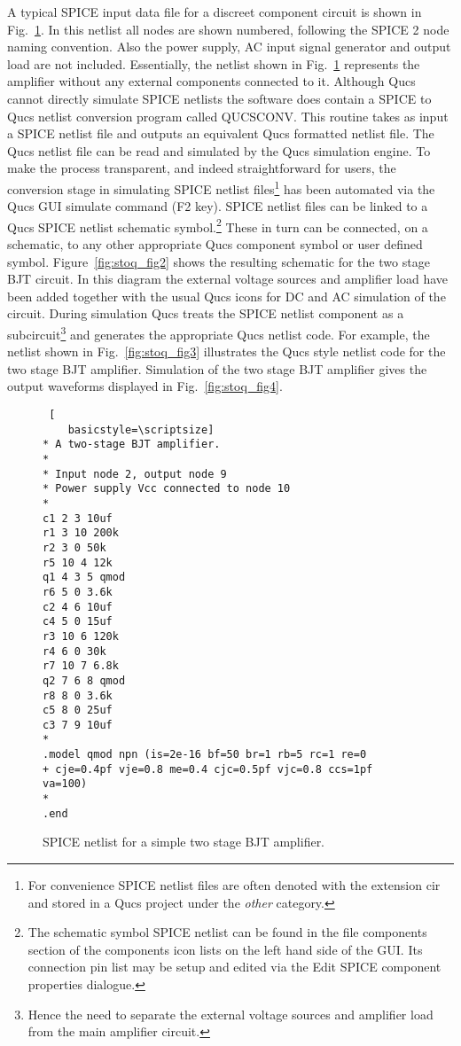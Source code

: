 A typical SPICE input data file for a discreet component circuit is shown in Fig.~\ref{fig:stoq_fig1}.  In this netlist all nodes are shown numbered, following the SPICE 2 node naming convention. Also the power supply, AC input signal generator and output load are not included. Essentially, the netlist shown in Fig.~\ref{fig:stoq_fig1} represents the amplifier without any external components connected to it. Although Qucs cannot directly simulate SPICE netlists the software does contain a SPICE to Qucs netlist conversion program called QUCSCONV. This routine takes as input a SPICE netlist file and outputs an equivalent Qucs formatted netlist file.  The Qucs netlist file can be read and simulated by the Qucs simulation engine.  To make the process transparent, and indeed straightforward for users, the conversion stage in simulating SPICE netlist files\footnote{For convenience SPICE netlist files are often denoted with the extension cir and stored in a Qucs project under the \textit{other} category.} has been automated via the Qucs GUI simulate command (F2 key). SPICE netlist files can be linked to a Qucs SPICE netlist schematic symbol.\footnote{The schematic symbol SPICE netlist can be found in the file components section of the components icon lists on the left hand side of the GUI. Its connection pin list may be setup and edited via the Edit SPICE component properties dialogue.} These in turn can be connected, on a schematic, to any other appropriate Qucs component symbol or user defined symbol. Figure~\ref{fig:stoq_fig2} shows the resulting schematic for the two stage BJT circuit.  In this diagram the external voltage sources and amplifier load have been added together with the usual Qucs icons for DC and AC simulation of the circuit. During simulation Qucs treats the SPICE netlist component as a subcircuit\footnote{Hence the need to separate the external voltage sources and amplifier load from the main amplifier circuit.} and generates the appropriate Qucs netlist code. For example, the netlist shown in Fig.~\ref{fig:stoq_fig3} illustrates the Qucs style netlist code for the two stage BJT amplifier. Simulation of the two stage BJT amplifier gives the output waveforms displayed in Fig.~\ref{fig:stoq_fig4}.

\begin{figure}
  \begin{lstlisting} [
    basicstyle=\scriptsize]
* A two-stage BJT amplifier.
*
* Input node 2, output node 9
* Power supply Vcc connected to node 10
*
c1 2 3 10uf
r1 3 10 200k
r2 3 0 50k
r5 10 4 12k
q1 4 3 5 qmod
r6 5 0 3.6k
c2 4 6 10uf
c4 5 0 15uf
r3 10 6 120k
r4 6 0 30k
r7 10 7 6.8k
q2 7 6 8 qmod
r8 8 0 3.6k
c5 8 0 25uf
c3 7 9 10uf 
*
.model qmod npn (is=2e-16 bf=50 br=1 rb=5 rc=1 re=0
+ cje=0.4pf vje=0.8 me=0.4 cjc=0.5pf vjc=0.8 ccs=1pf va=100)
*
.end
\end{lstlisting} 

  \caption{SPICE netlist for a simple two stage BJT amplifier.}
  \label{fig:stoq_fig1}
\end{figure} 

